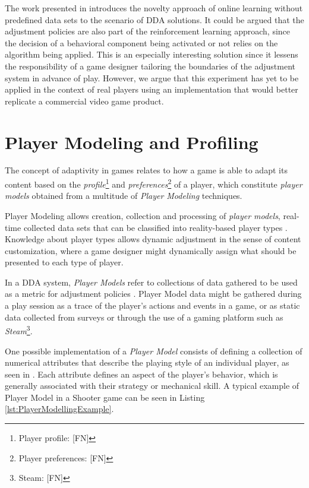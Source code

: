 The work presented in \cite{article_adaptivebehaviorai} introduces the novelty approach of online learning without predefined data sets to the scenario of DDA solutions. It could be argued that the adjustment policies are also part of the reinforcement learning approach, since the decision of a behavioral component being activated or not relies on the algorithm being applied. This is an especially interesting solution since it lessens the responsibility of a game designer tailoring the boundaries of the adjustment system in advance of play. However, we argue that this experiment has yet to be applied in the context of real players using an implementation that would better replicate a commercial video game product.

\section{Player Modeling and Profiling}

The concept of adaptivity in games relates to how a game is able to adapt its content based on the \emph{profile}\footnote{Player profile: [FN]} and \emph{preferences}\footnote{Player preferences: [FN]} of a player, which constitute \emph{player models} obtained from a multitude of \emph{Player Modeling} techniques.

Player Modeling allows creation, collection and processing of \emph{player models}, real-time collected data sets that can be classified into reality-based player types \cite{ARTICLE_DynamicPlayerModelling}. Knowledge about player types allows dynamic adjustment in the sense of content customization, where a game designer might dynamically assign what should be presented to each type of player.

In a DDA system, \emph{Player Models} refer to collections of data gathered to be used as a metric for adjustment policies \cite{PHD_DynamicDifficultyAdjustment}. Player Model data might be gathered during a play session as a trace of the player's actions and events in a game, or as static data collected from surveys or through the use of a gaming platform such as \emph{Steam}\footnote{Steam: [FN]}.

One possible implementation of a \emph{Player Model} consists of defining a collection of numerical attributes that describe the playing style of an individual player, as seen in \cite{BOOK_PlayerModeling}. Each attribute defines an aspect of the player's behavior, which is generally associated with their strategy or mechanical skill. A typical example of Player Model in a Shooter game can be seen in Listing \ref{lst:PlayerModellingExample}.

